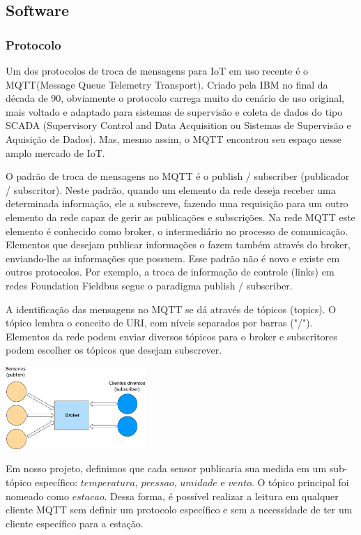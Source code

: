 \documentclass[twocolumn,11pt]{article}
\begin{document}
{\subsection{Software}\label{sw}
\subsubsection{Protocolo}\label{sw_protocolo}
Um dos protocolos de troca de mensagens para IoT em uso recente é o MQTT(Message Queue Telemetry Transport). Criado pela IBM no final da década de 90, obviamente o protocolo carrega muito do cenário de uso original, mais voltado e adaptado para sistemas de supervisão e coleta de dados do tipo SCADA (Supervisory Control and Data Acquisition ou Sistemas de Supervisão e Aquisição de Dados). Mas, mesmo assim, o MQTT encontrou seu espaço nesse amplo mercado de IoT.\par
O padrão de troca de mensagens no MQTT é o publish / subscriber (publicador / subscritor). Neste padrão, quando um elemento da rede deseja receber uma determinada informação, ele a subscreve, fazendo uma requisição para um outro elemento da rede capaz de gerir as publicações e subscrições. Na rede MQTT este elemento é conhecido como broker, o intermediário no processo de comunicação. Elementos que desejam publicar informações o fazem também através do broker, enviando-lhe as informações que possuem. Esse padrão não é novo e existe em outros protocolos. Por exemplo, a troca de informação de controle (links) em redes Foundation Fieldbus segue o paradigma publish / subscriber.\par
A identificação das mensagens no MQTT se dá através de tópicos (topics). O tópico lembra o conceito de URI, com níveis separados por barras ("/"). Elementos da rede podem enviar diversos tópicos para o broker e subscritores podem escolher os tópicos que desejam subscrever.\par
\includegraphics{mqtt_small.png}

Em nosso projeto, definimos que cada sensor publicaria sua medida em um sub-tópico específico: $temperatura$, $pressao$, $umidade$ e $vento$. O tópico principal foi nomeado como $estacao$. Dessa forma, é possível realizar a leitura em qualquer cliente MQTT sem definir um protocolo específico e sem a necessidade de ter um cliente específico para a estação.\par

}
\end{document}
